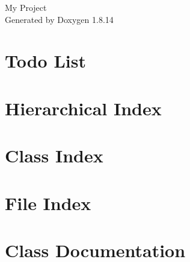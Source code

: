 \documentclass[twoside]{book}
\newcommand{\+}{\discretionary{\mbox{\scriptsize$\hookleftarrow$}}{}{}}
\newcommand{\clearemptydoublepage}{%
  \newpage{\pagestyle{empty}\cleardoublepage}%
}
\begin{document}
\hypersetup{pageanchor=false,
             bookmarksnumbered=true,
             pdfencoding=unicode
            }
\begin{titlepage}
\vspace*{7cm}
\begin{center}%
{\Large My Project }\\
\vspace*{1cm}
{\large Generated by Doxygen 1.8.14}\\
\end{center}
\end{titlepage}
\clearemptydoublepage
{}
\tableofcontents
\clearemptydoublepage
{}
\hypersetup{pageanchor=true}

\chapter{Todo List}
\label{todo}

\chapter{Hierarchical Index}

\chapter{Class Index}

\chapter{File Index}

\chapter{Class Documentation}
































\end{document}
